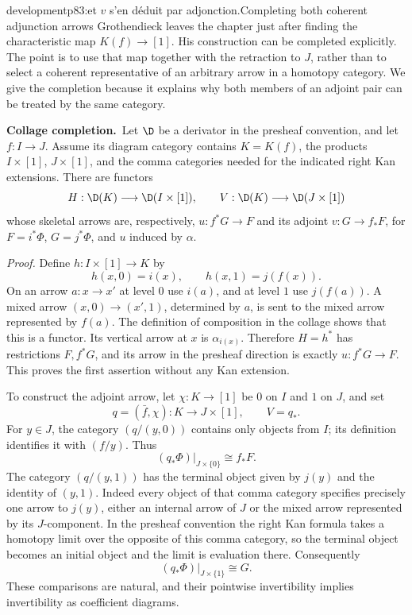 \begin{dcomment}{development}{p83:et $v$ s'en déduit par adjonction.}{Completing both coherent adjunction arrows}
Grothendieck leaves the chapter just after finding the characteristic map \(K(f)\to[1]\). His construction can be completed explicitly. The point is to use that map together with the retraction to \(J\), rather than to select a coherent representative of an arbitrary arrow in a homotopy category. We give the completion because it explains why both members of an adjoint pair can be treated by the same category.

\textbf{Collage completion.}\ours\
Let \(\D\) be a derivator in the presheaf convention, and let \(f:I\to J\). Assume its diagram category contains \(K=K(f)\), the products \(I\times[1]\), \(J\times[1]\), and the comma categories needed for the indicated right Kan extensions. There are functors
\[
 H:\D(K)\longrightarrow\D(I\times[1]),\qquad
 V:\D(K)\longrightarrow\D(J\times[1])
\]
whose skeletal arrows are, respectively, \(u:f^*G\to F\) and its adjoint \(v:G\to f_*F\), for \(F=i^*\Phi\), \(G=j^*\Phi\), and \(u\) induced by \(\alpha\).

\emph{Proof.}
Define \(h:I\times[1]\to K\) by
\[
 h(x,0)=i(x),\qquad h(x,1)=j(f(x)).
\]
On an arrow \(a:x\to x'\) at level \(0\) use \(i(a)\), and at level \(1\) use \(j(f(a))\). A mixed arrow \((x,0)\to(x',1)\), determined by \(a\), is sent to the mixed arrow represented by \(f(a)\). The definition of composition in the collage shows that this is a functor. Its vertical arrow at \(x\) is \(\alpha_{i(x)}\). Therefore \(H=h^*\) has restrictions \(F,f^*G\), and its arrow in the presheaf direction is exactly \(u:f^*G\to F\). This proves the first assertion without any Kan extension.

To construct the adjoint arrow, let \(\chi:K\to[1]\) be \(0\) on \(I\) and \(1\) on \(J\), and set
\[
 q=(\bar f,\chi):K\longrightarrow J\times[1],
 \qquad V=q_*.
\]
For \(y\in J\), the category \((q/(y,0))\) contains only objects from \(I\); its definition identifies it with \((f/y)\). Thus
\[
 (q_*\Phi)|_{J\times\{0\}}\cong f_*F.
\]
The category \((q/(y,1))\) has the terminal object given by \(j(y)\) and the identity of \((y,1)\). Indeed every object of that comma category specifies precisely one arrow to \(j(y)\), either an internal arrow of \(J\) or the mixed arrow represented by its \(J\)-component. In the presheaf convention the right Kan formula takes a homotopy limit over the opposite of this comma category, so the terminal object becomes an initial object and the limit is evaluation there. Consequently
\[
 (q_*\Phi)|_{J\times\{1\}}\cong G.
\]
These comparisons are natural, and their pointwise invertibility implies invertibility as coefficient diagrams.


\end{dcomment}
